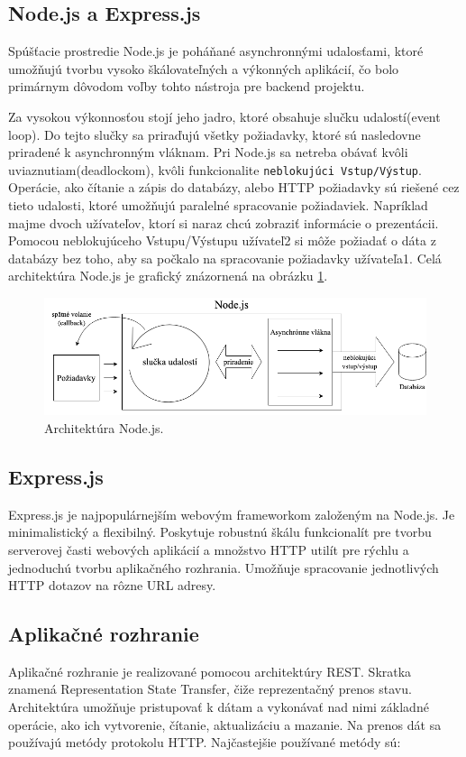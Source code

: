 \subsection{Node.js a Express.js}
\label{node}
Spúšťacie prostredie Node.js\cite{nodejs} je poháňané asynchronnými udalosťami, ktoré umožňujú tvorbu vysoko škálovateľných a výkonných aplikácií, čo bolo primárnym dôvodom voľby tohto nástroja pre backend projektu.

Za vysokou výkonnosťou stojí jeho jadro, ktoré obsahuje slučku udalostí(event loop). Do tejto slučky sa priraďujú všetky požiadavky, ktoré sú nasledovne priradené k asynchronným vláknam. Pri Node.js sa netreba obávať kvôli uviaznutiam(deadlockom), kvôli funkcionalite \texttt{neblokujúci Vstup/Výstup}. Operácie, ako čítanie a zápis do databázy, alebo HTTP požiadavky sú riešené cez tieto udalosti, ktoré umožňujú paralelné spracovanie požiadaviek. Napríklad majme dvoch užívateľov, ktorí si naraz chcú zobraziť informácie o prezentácii. Pomocou neblokujúceho Vstupu/Výstupu užívateľ2 si môže požiadať o dáta z databázy bez toho, aby sa počkalo na spracovanie požiadavky užívateľa1. Celá architektúra Node.js je grafický znázornená na obrázku \ref{pic:nodejs}.

    \begin{figure}[!hbt]
        \centering
        \includegraphics[scale=0.5]{obrazky/nodejs.png}
        \caption{Architektúra Node.js.}
        \label{pic:nodejs}
    \end{figure}
    
\subsection*{Express.js}
\label{express}
Express.js\cite{expressjs} je najpopulárnejším webovým frameworkom založeným na Node.js. Je minimalistický a flexibilný. Poskytuje robustnú škálu funkcionalít pre tvorbu serverovej časti webových aplikácií a množstvo HTTP utilít pre rýchlu a jednoduchú tvorbu aplikačného rozhrania. Umožňuje spracovanie jednotlivých HTTP dotazov na rôzne URL adresy.

\subsection{Aplikačné rozhranie}
\label{api}
Aplikačné rozhranie je realizované pomocou architektúry REST. Skratka znamená Representation State Transfer, čiže reprezentačný prenos stavu. Architektúra umožňuje pristupovať k dátam a vykonávať nad nimi základné operácie, ako ich vytvorenie, čítanie, aktualizáciu a mazanie. Na prenos dát sa používajú metódy protokolu HTTP. Najčastejšie používané metódy sú:

